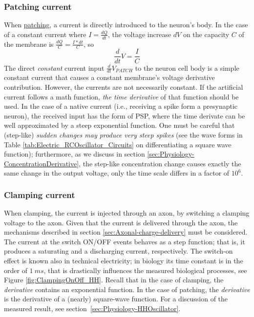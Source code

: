 \subsubsection{Patching current\label{sec:Physiology-NeuralCurrentsPATCHING}}
When \hyperlink{voltage-clamping}{patching}, a current is directly introduced to the neuron's body. 
In the case of a constant current where $I=\frac{dQ}{dt}$, the voltage increase $dV$
on the capacity $C$ of the membrane is $\frac{dQ}{C}=\frac{I*dt}{C}$,
so 
\[\frac{d}{dt} V=\frac{I}{C}\]
The direct \textit{constant} current input $\frac{d}{dt} V_{PATCH}$
to the neuron cell body is a simple constant current that causes a constant membrane's voltage derivative contribution.
However, the currents are not necessarily constant. 
If the artificial current follows a math function,
\textit{the time derivative} of that function should be used.
In the case of a native current (i.e., receiving a spike form a presynaptic neuron), the received input has the form of 
PSP, where the time derivate can be well approximated by a steep exponential function.
One must be careful that (step-like) \textit{sudden  changes
may produce very steep spikes} (see the wave forms in Table \ref{tab:Electric_RCOscillator_Circuits} on differentiating a square wave function); furthermore, as we discuss in section \ref{sec:Physiology-ConcentrationDerivative}, the step-like
concentration change causes exactly the same change in the output voltage, only the time scale differs in a factor of $10^6$.

\subsubsection{Clamping current\label{sec:Physiology-NeuralCurrents_CLAMPING}} 
When clamping, the current is injected through an axon, by switching a clamping
voltage to the axon. Given that the current is delivered through the axon, the mechanisms described in section \ref{sec:Axonal-charge-delivery} must be considered.
%
The current at the switch ON/OFF events behaves as a step function;
that is,  it produces a saturating and a discharging current, respectively.
The switch-on effect is known also in technical electricity; in biology
its time constant is in the order of $1\ ms$,
that is drastically influences the measured biological processes, see Figure \ref{fig:ClampingOnOff_HH}.
Recall that in the case of clamping, the \textit{derivative} contains an exponential function.
In the case of patching, the  \textit{derivative} is the derivative of a (nearly) square-wave function. For a discussion of the measured result, see section~\ref{sec:Physiology-HHOscillator}.


